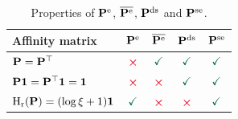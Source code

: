 \begin{table}
\begin{center}
\caption{Properties of $\mathbf{P}^{\mathrm{e}}$, $\overline{\mathbf{P}^{\mathrm{e}}}$, $\mathbf{P}^{\mathrm{ds}}$ and $\mathbf{P}^{\mathrm{se}}$.}
  \begin{tabular}{lcccc}
  \toprule[1.5pt]
  \label{fig:recap_properties_sym}
  Affinity matrix& $\mathbf{P}^{\mathrm{e}}$& $\overline{\mathbf{P}^{\mathrm{e}}}$
  & $\mathbf{P}^{\mathrm{ds}}$& $\mathbf{P}^{\mathrm{se}}$ \\
  \midrule
  $\mathbf{P}=\mathbf{P}^\top$ & $\red{\boldsymbol\times}$ & $\green{\checkmark}$ & $\green{\checkmark}$ & $\green{\checkmark}$ \\
  $\mathbf{P} \bm{1} = \mathbf{P}^\top \bm{1} = \bm{1}$ & $\red{\boldsymbol\times}$ & $\red{\boldsymbol\times}$ & $\green{\checkmark}$ & $\green{\checkmark}$ \\
  $\operatorname{H}_{\mathrm{r}}(\mathbf{P}) = (\log \xi + 1)\bm{1}$ & $\green{\checkmark}$ & $\red{\boldsymbol\times}$ & $\red{\boldsymbol\times}$ & $\green{\checkmark}$ \\
  \bottomrule[1.5pt]
  \end{tabular}
  \end{center}
\end{table}


